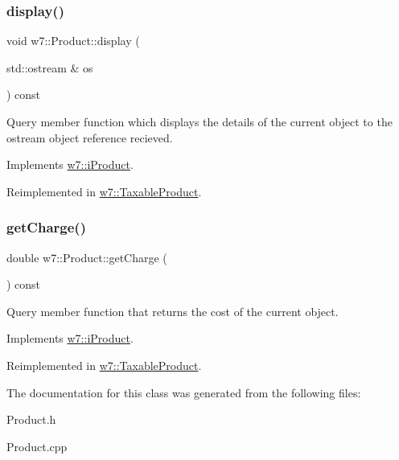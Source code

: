 \subsubsection{\texorpdfstring{display()}{display()}}
{\footnotesize\ttfamily void w7\+::\+Product\+::display (\begin{DoxyParamCaption}\item[{std\+::ostream \&}]{os }\end{DoxyParamCaption}) const\hspace{0.3cm}{\ttfamily [virtual]}}

Query member function which displays the details of the current object to the ostream object reference recieved. 

Implements \mbox{\hyperlink{classw7_1_1iProduct_ad5aa580821cd5cac0acd07841019ed82}{w7\+::i\+Product}}.



Reimplemented in \mbox{\hyperlink{classw7_1_1TaxableProduct_a57f8cd41d82054c77a7f7f1cf204cc7d}{w7\+::\+Taxable\+Product}}.

\mbox{\label{classw7_1_1Product_a6d73613659451d1492541ef3d0d016b7}} 
\subsubsection{\texorpdfstring{get\+Charge()}{getCharge()}}
{\footnotesize\ttfamily double w7\+::\+Product\+::get\+Charge (\begin{DoxyParamCaption}{ }\end{DoxyParamCaption}) const\hspace{0.3cm}{\ttfamily [virtual]}}

Query member function that returns the cost of the current object. 

Implements \mbox{\hyperlink{classw7_1_1iProduct_a4e9fde11cffac0e4309c89d252db89bb}{w7\+::i\+Product}}.



Reimplemented in \mbox{\hyperlink{classw7_1_1TaxableProduct_a3f41864e2a88fa6d847b7fcb704f41f9}{w7\+::\+Taxable\+Product}}.



The documentation for this class was generated from the following files\+:\begin{DoxyCompactItemize}
\item 
Product.\+h\item 
Product.\+cpp\end{DoxyCompactItemize}
